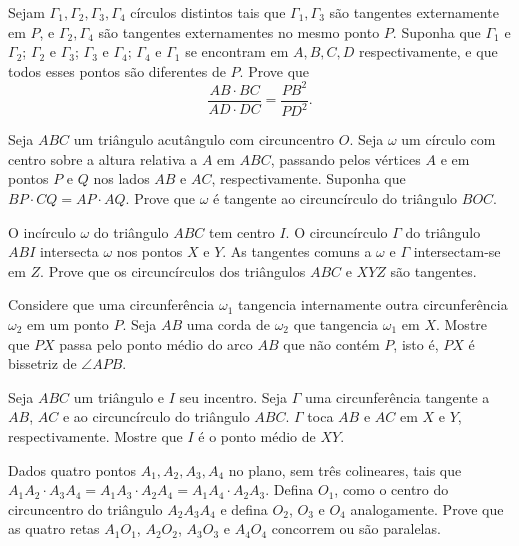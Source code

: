 \documentclass[final, 10pt, a4paper]{article}
\begin{document}
	\begin{prob}
		Sejam $\Gamma_1, \Gamma_2, \Gamma_3, \Gamma_4$ círculos distintos tais que $\Gamma_1, \Gamma_3$ são tangentes externamente em $P$, e $\Gamma_2, \Gamma_4$ são tangentes externamentes no mesmo ponto $P$. Suponha que $\Gamma_1$ e $\Gamma_2$; $\Gamma_2$ e $\Gamma_3$; $\Gamma_3$ e $\Gamma_4$; $\Gamma_4$ e $\Gamma_1$ se encontram em $A, B, C, D$ respectivamente, e que todos esses pontos são diferentes de $P$. Prove que \[\frac{AB \cdot BC}{AD \cdot DC} = \frac{PB^2}{PD^2}.\] 
	\end{prob}
	\begin{prob}
		Seja $ABC$ um triângulo acutângulo com circuncentro $O$. Seja $\omega$ um círculo com centro sobre a altura relativa a $A$ em $ABC$, passando pelos vértices $A$ e em pontos $P$ e $Q$ nos lados $AB$ e $AC$, respectivamente. Suponha que $BP \cdot CQ = AP \cdot AQ$. Prove que $\omega$ é tangente ao circuncírculo do triângulo $BOC$.
	\end{prob}
	\begin{prob}
		O incírculo $\omega$ do triângulo $ABC$ tem centro $I$. O circuncírculo $\Gamma$ do triângulo $ABI$ intersecta $\omega$ nos pontos $X$ e $Y$. As tangentes comuns a $\omega$ e $\Gamma$ intersectam-se em $Z$. Prove que os circuncírculos dos triângulos $ABC$ e $XYZ$ são tangentes.
	\end{prob}
	\begin{prob}
		Considere que uma circunferência $\omega_1$ tangencia internamente outra circunferência $\omega_2$ em um ponto $P$. Seja $AB$ uma corda de $\omega_2$ que tangencia $\omega_1$ em $X$. Mostre que $PX$ passa pelo ponto médio do arco $AB$ que não contém $P$, isto é, $PX$ é bissetriz de $\angle APB$.
	\end{prob}
	\begin{prob}
		Seja $ABC$ um triângulo e $I$ seu incentro. Seja $\Gamma$ uma circunferência tangente a $AB$, $AC$ e ao circuncírculo do triângulo $ABC$. $\Gamma$ toca $AB$ e $AC$ em $X$ e $Y$, respectivamente. Mostre que $I$ é o ponto médio de $XY$.
	\end{prob}
	\begin{prob}
		Dados quatro pontos $A_1, A_2, A_3, A_4$ no plano, sem três colineares, tais que $A_1A_2 \cdot A_3A_4 = A_1A_3 \cdot A_2A_4 = A_1A_4 \cdot A_2A_3$. Defina $O_1$, como o centro do circuncentro do triângulo $A_2A_3A_4$ e defina $O_2$, $O_3$ e $O_4$ analogamente. Prove que as quatro retas $A_1O_1$, $A_2O_2$, $A_3O_3$ e $A_4O_4$ concorrem ou são paralelas.
	\end{prob}
\end{document}
